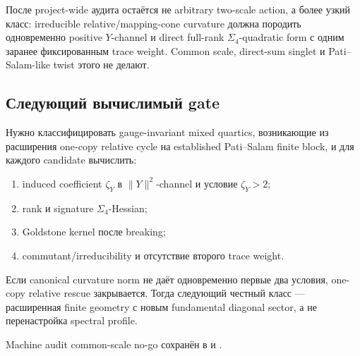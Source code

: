 \begin{proposition}
После project-wide аудита остаётся не arbitrary two-scale action, а более
узкий класс: irreducible relative/mapping-cone curvature должна породить
одновременно positive \(Y\)-channel и direct full-rank
\(\Sigma_4\)-quadratic form с одним заранее фиксированным trace weight.
Common scale, direct-sum singlet и Pati--Salam-like twist этого не делают.
\end{proposition}

\subsection{Следующий вычислимый gate}

Нужно классифицировать gauge-invariant mixed quartics, возникающие из
расширения one-copy relative cycle на established Pati--Salam finite block,
и для каждого candidate вычислить:
\begin{enumerate}
 \item induced coefficient \(\zeta_Y\) в \(\|Y\|^2\)-channel и условие
 \(\zeta_Y>2\);
 \item rank и signature \(\Sigma_4\)-Hessian;
 \item Goldstone kernel после breaking;
 \item commutant/irreducibility и отсутствие второго trace weight.
\end{enumerate}
Если canonical curvature norm не даёт одновременно первые два условия,
one-copy relative rescue закрывается. Тогда следующий честный класс ---
расширенная finite geometry с новым fundamental diagonal sector, а не
перенастройка spectral profile.

Machine audit common-scale no-go сохранён в
 и
.